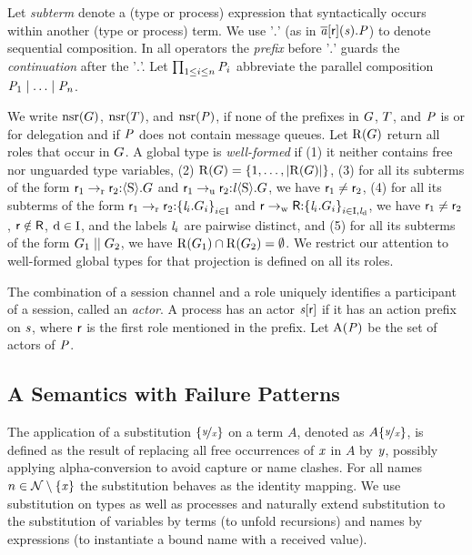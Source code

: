 Let \emph{subterm} denote a (type or process) expression that syntactically occurs within another (type or process) term.
We use '$. $' (as \eg in $ \PReq{\Chan[a]}{\Role}{\Chan}{\PT} $) to denote sequential composition. In all operators the \emph{prefix} before '$. $' guards the \emph{continuation} after the '$. $'.
Let $ \prod_{1 \leq i \leq n} \PT_i $ abbreviate the parallel composition $ \PPar{\PT_1}{\PPar{\ldots}{\PT_n}} $.

We write  $ \Unreliable{\GT} $, $ \Unreliable{\LT} $, and $ \Unreliable{\PT} $, if none of the prefixes in $ \GT $, $ \LT $, and $ \PT $ is \strongR or for delegation and if $ \PT $ does not contain message queues.
Let $ \Roles{\GT} $ return all roles that occur in $ \GT $.
A global type is \emph{well-formed} if
(1) it neither contains free nor unguarded type variables,
(2) $ \Roles{G} = \Set{ 1, \ldots, \Length{\Roles{G}} } $,
(3) for all its subterms of the form $ \GComR{\Role_1}{\Role_2}{\Sort}{\GT} $ and $ \GComU{\Role_1}{\Role_2}{\Label}{\Sort}{\GT} $, we have $ \Role_1 \neq \Role_2 $,
(4) for all its subterms of the form $ \GBranR{\Role_1}{\Role_2}{\Set{ \Label_i.\GT_i }_{i \in \indexSet}} $ and $ \GBranW{\Role}{\Role[R]}{\Set{ \Label_i.\GT_i }_{i \in \indexSet, \LabelD}} $, we have $ \Role_1 \neq \Role_2 $, $ \Role \notin \Role[R] $, $ \default \in \indexSet $, and the labels $ \Label_i $ are pairwise distinct, and
(5) for all its subterms of the form $ \GPar{\GT_1}{\GT_2} $, we have $ \Roles{\GT_1} \cap \Roles{\GT_2} = \emptyset $.
We restrict our attention to well-formed global types for that projection is defined on all its roles.

The combination of a session channel and a role uniquely identifies a participant of a session, called an \emph{actor}. A process has an actor $ \AT{\Chan[s]}{\Role} $ if it has an action prefix on $ \Chan $, where $ \Role $ is the first role mentioned in the prefix.
Let $ \Actors{\PT} $ be the set of actors of $ \PT $.

\subsection{A Semantics with Failure Patterns}
\label{sec:failurePatterns}

The application of a substitution $ \Subst{\Args[y]}{\Args} $ on a term $ A $, denoted as $ A\Subst{\Args[y]}{\Args} $, is defined as the result of replacing all free occurrences of $ \Args $ in $ A $ by $ \Args[y] $, possibly applying alpha-conversion to avoid capture or name clashes. For all names $ n \in \names \setminus \Set{ \Args } $ the substitution behaves as the identity mapping. We use substitution on types as well as processes and naturally extend substitution to the substitution of variables by terms (to unfold recursions) and names by expressions (to instantiate a bound name with a received value).

